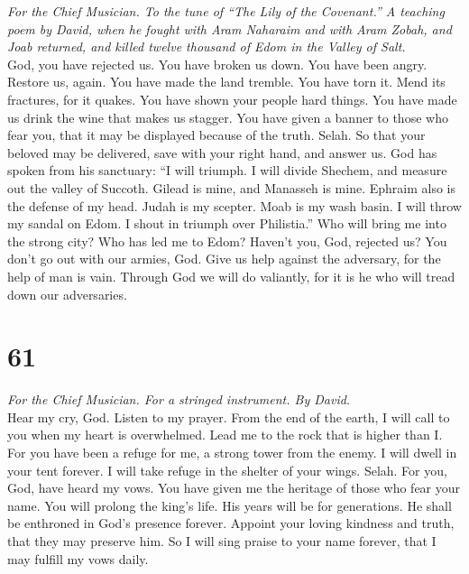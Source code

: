 \emph{For the Chief Musician. To the tune of ``The Lily of the
Covenant.'' A teaching poem by David, when he fought with Aram Naharaim
and with Aram Zobah, and Joab returned, and killed twelve thousand of
Edom in the Valley of Salt.}\\
 God, you have rejected us. You have broken us down. You
have been angry. Restore us, again.  You have made the
land tremble. You have torn it. Mend its fractures, for it quakes.
 You have shown your people hard things. You have made us
drink the wine that makes us stagger.  You have given a
banner to those who fear you, that it may be displayed because of the
truth. Selah.  So that your beloved may be delivered, save
with your right hand, and answer us.  God has spoken from
his sanctuary: ``I will triumph. I will divide Shechem, and measure out
the valley of Succoth.  Gilead is mine, and Manasseh is
mine. Ephraim also is the defense of my head. Judah is my scepter.
 Moab is my wash basin. I will throw my sandal on Edom. I
shout in triumph over Philistia.''  Who will bring me into
the strong city? Who has led me to Edom?  Haven't you,
God, rejected us? You don't go out with our armies, God. 
Give us help against the adversary, for the help of man is vain.
 Through God we will do valiantly, for it is he who will
tread down our adversaries.

\hypertarget{section-60}{%
\section{61}\label{section-60}}

\emph{For the Chief Musician. For a stringed instrument. By David.}\\
 Hear my cry, God. Listen to my prayer. 
From the end of the earth, I will call to you when my heart is
overwhelmed. Lead me to the rock that is higher than I. 
For you have been a refuge for me, a strong tower from the enemy.
 I will dwell in your tent forever. I will take refuge in
the shelter of your wings. Selah.  For you, God, have
heard my vows. You have given me the heritage of those who fear your
name.  You will prolong the king's life. His years will be
for generations.  He shall be enthroned in God's presence
forever. Appoint your loving kindness and truth, that they may preserve
him.  So I will sing praise to your name forever, that I
may fulfill my vows daily.

